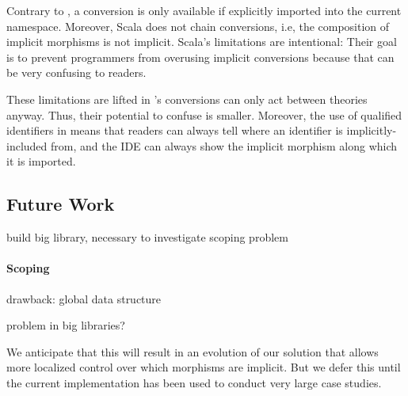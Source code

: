 Contrary to \mmt, a conversion is only available if explicitly imported into the current namespace.
Moreover, Scala does not chain conversions, i.e, the composition of implicit morphisms is not implicit.
Scala's limitations are intentional: Their goal is to prevent programmers from overusing implicit conversions because that can be very confusing to readers.

These limitations are lifted in \mmt's conversions can only act between theories anyway.
Thus, their potential to confuse is smaller.
Moreover, the use of qualified identifiers in \mmt means that readers can always tell where an identifier is implicitly-included from, and the \mmt IDE can always show the implicit morphism along which it is imported.

\subsection{Future Work}


build big library, necessary to investigate scoping problem

\paragraph{Scoping}
drawback: global data structure

problem in big libraries?

We anticipate that this will result in an evolution of our solution that allows more localized control over which morphisms are implicit.
But we defer this until the current implementation has been used to conduct very large case studies.